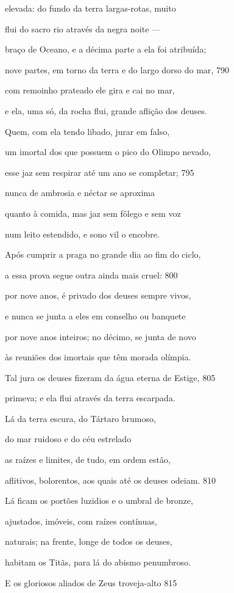elevada: do fundo da terra largas-rotas, muito

flui do sacro rio através da negra noite ---

braço de Oceano, e a décima parte a ela foi atribuída;

nove partes, em torno da terra e do largo dorso do mar, \num{790}

com remoinho prateado ele gira e cai no mar,

e ela, uma só, da rocha flui, grande aflição dos deuses.

Quem, com ela tendo libado, jurar em falso,

um imortal dos que possuem o pico do Olimpo nevado,

esse jaz sem respirar até um ano se completar; \num{795}

nunca de ambrosia e néctar se aproxima

quanto à comida, mas jaz sem fôlego e sem voz

num leito estendido, e sono vil o encobre.

Após cumprir a praga no grande dia ao fim do ciclo,

a essa prova segue outra ainda mais cruel: \num{800}

por nove anos, é privado dos deuses sempre vivos,

e nunca se junta a eles em conselho ou banquete

por nove anos inteiros; no décimo, se junta de novo

às reuniões dos imortais que têm morada olímpia.

Tal jura os deuses fizeram da água eterna de Estige, \num{805}

primeva; e ela flui através da terra escarpada.

\quad{}Lá da terra escura, do Tártaro brumoso,

do mar ruidoso e do céu estrelado

as raízes e limites, de tudo, em ordem estão,

aflitivos, bolorentos, aos quais até os deuses odeiam. \num{810}

\quad{}Lá ficam os portões luzidios e o umbral de bronze,

ajustados, imóveis, com raízes contínuas,

naturais; na frente, longe de todos os deuses,

habitam os Titãs, para lá do abismo penumbroso.

E os gloriosos aliados de Zeus troveja-alto \num{815}

